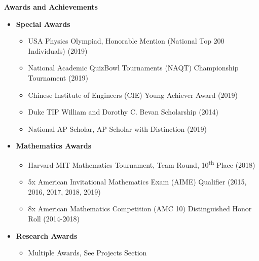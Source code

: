 \documentclass[letterpaper,11pt]{article}
\newcommand{\resheading}[1]{{\large \colorbox{mygrey}{\begin{minipage}{\textwidth}{\textbf{#1 \vphantom{p\^{E}}}}\end{minipage}}}}
\newcommand{\myitem}[1]{\item #1 \vspace{-9pt}}
\newcommand{\mysubitem}[1]{\item #1 \vspace{-4pt}}
\begin{document}
\resheading{Awards and Achievements}
	\begin{itemize}
	
		
		\myitem {\textbf{Special Awards}}
			\begin{itemize}
				\mysubitem {USA Physics Olympiad, Honorable Mention (National Top 200 Individuals) (2019)}
				\mysubitem {National Academic QuizBowl Tournaments (NAQT) Championship Tournament (2019)}
				\mysubitem {Chinese Institute of Engineers (CIE) Young Achiever Award (2019)}
				\mysubitem {Duke TIP William and Dorothy C. Bevan Scholarship (2014)}
				\mysubitem {National AP Scholar, AP Scholar with Distinction (2019)}
			\end{itemize} \vspace{-9pt}
			
		\myitem {\textbf{Mathematics Awards}}
			\begin{itemize}
				\mysubitem {Harvard-MIT Mathematics Tournament, Team Round, 10\textsuperscript{th} Place (2018)}
				\mysubitem {5x American Invitational Mathematics Exam (AIME) Qualifier (2015, 2016, 2017, 2018, 2019)}
				\mysubitem {8x American Mathematics Competition (AMC 10) Distinguished Honor Roll (2014-2018)}
			\end{itemize} \vspace{-9pt}
			

		\myitem {\textbf{Research Awards}}
			\begin{itemize}
				\mysubitem {Multiple Awards, See Projects Section}
			\end{itemize} \vspace{-3pt}
			
	\end{itemize}
\end{document}
